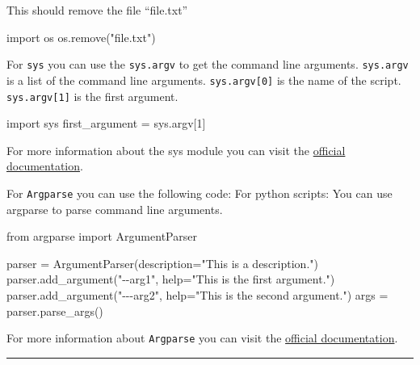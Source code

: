 \documentclass[
  letterpaper,
  DIV=11,
  numbers=noendperiod]{scrreprt}
\newenvironment{Shaded}{\begin{snugshade}}{\end{snugshade}}
\newcommand{\BuiltInTok}[1]{\textcolor[rgb]{0.00,0.23,0.31}{#1}}
\newcommand{\DecValTok}[1]{\textcolor[rgb]{0.68,0.00,0.00}{#1}}
\newcommand{\ImportTok}[1]{\textcolor[rgb]{0.00,0.46,0.62}{#1}}
\newcommand{\NormalTok}[1]{\textcolor[rgb]{0.00,0.23,0.31}{#1}}
\newcommand{\OperatorTok}[1]{\textcolor[rgb]{0.37,0.37,0.37}{#1}}
\newcommand{\StringTok}[1]{\textcolor[rgb]{0.13,0.47,0.30}{#1}}
\begin{document}
This should remove the file ``file.txt''

\begin{Shaded}
\begin{Highlighting}[]
\ImportTok{import}\NormalTok{ os}
\NormalTok{os.remove(}\StringTok{"file.txt"}\NormalTok{)}
\end{Highlighting}
\end{Shaded}

For \texttt{sys} you can use the \texttt{sys.argv} to get the command
line arguments. \texttt{sys.argv} is a list of the command line
arguments. \texttt{sys.argv{[}0{]}} is the name of the script.
\texttt{sys.argv{[}1{]}} is the first argument.

\begin{Shaded}
\begin{Highlighting}[]
\ImportTok{import}\NormalTok{ sys}
\NormalTok{first\_argument }\OperatorTok{=}\NormalTok{ sys.argv[}\DecValTok{1}\NormalTok{]}
\end{Highlighting}
\end{Shaded}

For more information about the sys module you can visit the
\href{https://docs.python.org/3/library/sys.html}{official
documentation}.

For \texttt{Argparse} you can use the following code: For python
scripts: You can use argparse to parse command line arguments.

\begin{Shaded}
\begin{Highlighting}[]
\ImportTok{from}\NormalTok{ argparse }\ImportTok{import}\NormalTok{ ArgumentParser}

\NormalTok{parser }\OperatorTok{=}\NormalTok{ ArgumentParser(description}\OperatorTok{=}\StringTok{"This is a description."}\NormalTok{)}
\NormalTok{parser.add\_argument(}\StringTok{"{-}{-}arg1"}\NormalTok{, }\BuiltInTok{help}\OperatorTok{=}\StringTok{"This is the first argument."}\NormalTok{)}
\NormalTok{parser.add\_argument(}\StringTok{"{-}{-}{-}arg2"}\NormalTok{, }\BuiltInTok{help}\OperatorTok{=}\StringTok{"This is the second argument."}\NormalTok{)}
\NormalTok{args }\OperatorTok{=}\NormalTok{ parser.parse\_args()}
\end{Highlighting}
\end{Shaded}

For more information about \texttt{Argparse} you can visit the
\href{https://docs.python.org/3/library/argparse.html}{official
documentation}.

\begin{center}\rule{0.5\linewidth}{0.5pt}\end{center}
\end{document}
